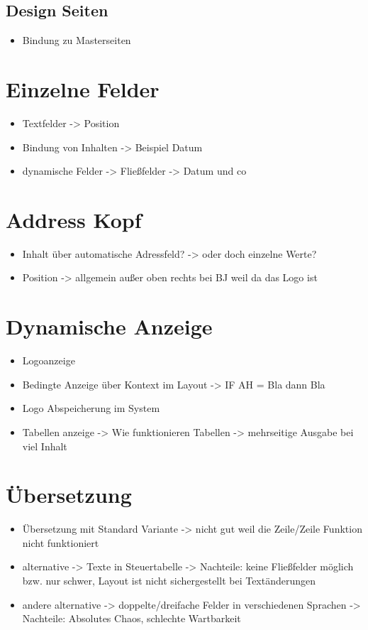 \subsection{Design Seiten}

	\begin{itemize}
		\item Bindung zu Masterseiten
	\end{itemize}
\section{Einzelne Felder}
	\begin{itemize}
		\item Textfelder -> Position
		\item Bindung von Inhalten -> Beispiel Datum
		\item dynamische Felder -> Fließfelder -> Datum und co
	\end{itemize}
\section{Address Kopf}

	\begin{itemize}
		\item Inhalt über automatische Adressfeld? -> oder doch einzelne Werte?
		\item Position -> allgemein außer oben rechts bei BJ weil da das Logo ist
	\end{itemize}
\section{Dynamische Anzeige}

	\begin{itemize}
		\item Logoanzeige
		\item Bedingte Anzeige über Kontext im Layout -> IF AH = Bla dann Bla
		\item Logo Abspeicherung im System
		
		\item Tabellen anzeige -> Wie funktionieren Tabellen -> mehrseitige Ausgabe bei viel Inhalt
		
	\end{itemize}
\section{Übersetzung}

	\begin{itemize}
		\item Übersetzung mit Standard Variante -> nicht gut weil die Zeile/Zeile Funktion nicht funktioniert
		\item alternative -> Texte in Steuertabelle -> Nachteile: keine Fließfelder möglich bzw. nur schwer, Layout ist nicht sichergestellt bei Textänderungen
		\item andere alternative -> doppelte/dreifache Felder in verschiedenen Sprachen -> Nachteile: Absolutes Chaos, schlechte Wartbarkeit
	\end{itemize}

